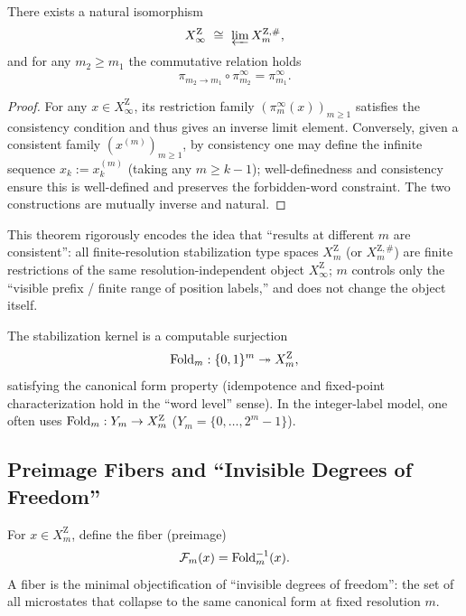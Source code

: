 \begin{theorem}\label{thm:inverse-limit-Xinf}
There exists a natural isomorphism
\[
X_\infty^{\mathrm Z}\ \cong\ \varprojlim X_m^{\mathrm Z,\#},
\]
and for any $m_2\ge m_1$ the commutative relation holds
\[
\pi_{m_2\to m_1}\circ \pi_{m_2}^\infty=\pi_{m_1}^\infty.
\]
\end{theorem}

\begin{proof}
For any $x\in X_\infty^{\mathrm Z}$, its restriction family $(\pi_m^\infty(x))_{m\ge 1}$ satisfies the consistency condition and thus gives an inverse limit element. Conversely, given a consistent family $(x^{(m)})_{m\ge 1}$, by consistency one may define the infinite sequence $x_k:=x^{(m)}_k$ (taking any $m\ge k-1$); well-definedness and consistency ensure this is well-defined and preserves the forbidden-word constraint. The two constructions are mutually inverse and natural.
\end{proof}

This theorem rigorously encodes the idea that ``results at different $m$ are consistent'': all finite-resolution stabilization type spaces $X_m^{\mathrm Z}$ (or $X_m^{\mathrm Z,\#}$) are finite restrictions of the same resolution-independent object $X_\infty^{\mathrm Z}$; $m$ controls only the ``visible prefix / finite range of position labels,'' and does not change the object itself.

\begin{definition}\label{def:fold}
The stabilization kernel is a computable surjection
\[
\mathrm{Fold}_m:\{0,1\}^m\twoheadrightarrow X_m^{\mathrm Z},
\]
satisfying the canonical form property (idempotence and fixed-point characterization hold in the ``word level'' sense).
In the integer-label model, one often uses $\mathrm{Fold}_m:Y_m\to X_m^{\mathrm Z}$ ($Y_m=\{0,\dots,2^m-1\}$).
\end{definition}

\subsection{Preimage Fibers and ``Invisible Degrees of Freedom''}

\begin{definition}[Fiber]\label{def:fiber}
For $x\in X_m^{\mathrm Z}$, define the fiber (preimage)
\[
\mathcal{F}_m(x)=\mathrm{Fold}_m^{-1}(x).
\]
A fiber is the minimal objectification of ``invisible degrees of freedom'': the set of all microstates that collapse to the same canonical form at fixed resolution $m$.
\end{definition}

